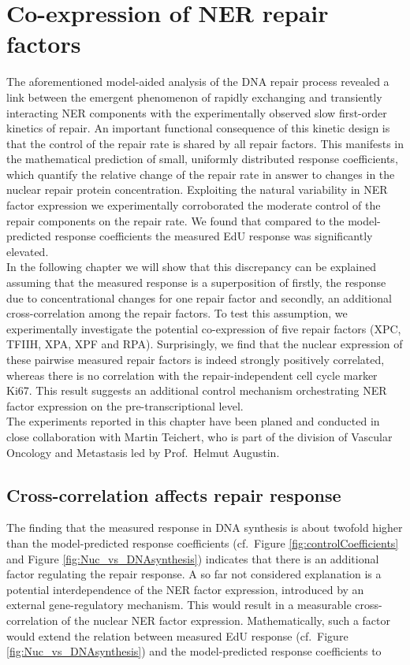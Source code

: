 \chapter{Co-expression of NER repair factors}
The aforementioned model-aided analysis of the DNA repair process revealed a link between the emergent phenomenon of rapidly exchanging and transiently interacting NER components with the experimentally observed slow first-order kinetics of repair. An important functional consequence of this kinetic design is that the control of the repair rate is shared by all repair factors. This manifests in the mathematical prediction of small, uniformly distributed response coefficients, which quantify the relative change of the repair rate in answer to changes in the nuclear repair protein concentration. Exploiting the natural variability in NER factor expression we experimentally corroborated the moderate control of the repair components on the repair rate. We found that compared to the model-predicted response coefficients the measured EdU response was significantly elevated. \\ 
In the following chapter we will show that this discrepancy can be explained assuming that the measured response is a superposition of firstly, the response due to concentrational changes for one repair factor and secondly, an additional cross-correlation among the repair factors. To test this assumption, we experimentally investigate the potential co-expression of five repair factors (XPC, TFIIH, XPA, XPF and RPA). Surprisingly, we find that the nuclear expression of these pairwise measured repair factors is indeed strongly positively correlated, whereas there is no correlation with the repair-independent cell cycle marker Ki67. This result suggests an additional control mechanism orchestrating NER factor expression on the pre-transcriptional level.\\ 

The experiments reported in this chapter have been planed and conducted in close collaboration with Martin Teichert, who is part of the division of Vascular Oncology and Metastasis led by Prof.\ Helmut Augustin. 
 



\section{Cross-correlation affects repair response}
\label{sec:crossCorelResponse}
The finding that the measured response in DNA synthesis is about twofold higher than the model-predicted response coefficients (cf.\ Figure \ref{fig:controlCoefficients} and Figure \ref{fig:Nuc_vs_DNAsynthesis}) indicates that there is an additional factor regulating the repair response. A so far not considered explanation is a potential interdependence of the NER factor expression, introduced by an external gene-regulatory mechanism. This would result in a measurable cross-correlation of the nuclear NER factor expression. Mathematically, such a factor would extend the relation between measured EdU response (cf.\ Figure \ref{fig:Nuc_vs_DNAsynthesis}) and the model-predicted response coefficients to 

